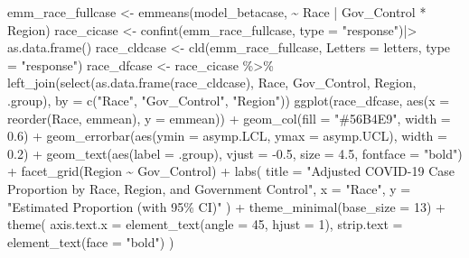\documentclass[
  letterpaper,
  DIV=11,
  numbers=noendperiod]{scrartcl}
\newenvironment{Shaded}{\begin{snugshade}}{\end{snugshade}}
\newcommand{\AttributeTok}[1]{\textcolor[rgb]{0.40,0.45,0.13}{#1}}
\newcommand{\DecValTok}[1]{\textcolor[rgb]{0.68,0.00,0.00}{#1}}
\newcommand{\FloatTok}[1]{\textcolor[rgb]{0.68,0.00,0.00}{#1}}
\newcommand{\FunctionTok}[1]{\textcolor[rgb]{0.28,0.35,0.67}{#1}}
\newcommand{\NormalTok}[1]{\textcolor[rgb]{0.00,0.23,0.31}{#1}}
\newcommand{\OtherTok}[1]{\textcolor[rgb]{0.00,0.23,0.31}{#1}}
\newcommand{\SpecialCharTok}[1]{\textcolor[rgb]{0.37,0.37,0.37}{#1}}
\newcommand{\StringTok}[1]{\textcolor[rgb]{0.13,0.47,0.30}{#1}}
\begin{document}
\begin{Shaded}
\begin{Highlighting}[]
\NormalTok{emm\_race\_fullcase }\OtherTok{\textless{}{-}} \FunctionTok{emmeans}\NormalTok{(model\_betacase, }\SpecialCharTok{\textasciitilde{}}\NormalTok{ Race }\SpecialCharTok{|}\NormalTok{ Gov\_Control }\SpecialCharTok{*}\NormalTok{ Region)}
\NormalTok{race\_cicase }\OtherTok{\textless{}{-}} \FunctionTok{confint}\NormalTok{(emm\_race\_fullcase, }\AttributeTok{type =} \StringTok{"response"}\NormalTok{)}\SpecialCharTok{|\textgreater{}}
  \FunctionTok{as.data.frame}\NormalTok{()}
\NormalTok{race\_cldcase }\OtherTok{\textless{}{-}} \FunctionTok{cld}\NormalTok{(emm\_race\_fullcase, }\AttributeTok{Letters =}\NormalTok{ letters, }\AttributeTok{type =} \StringTok{"response"}\NormalTok{)}
\NormalTok{race\_dfcase }\OtherTok{\textless{}{-}}\NormalTok{ race\_cicase }\SpecialCharTok{\%\textgreater{}\%}
  \FunctionTok{left\_join}\NormalTok{(}\FunctionTok{select}\NormalTok{(}\FunctionTok{as.data.frame}\NormalTok{(race\_cldcase), Race, Gov\_Control, Region, .group),}
            \AttributeTok{by =} \FunctionTok{c}\NormalTok{(}\StringTok{"Race"}\NormalTok{, }\StringTok{"Gov\_Control"}\NormalTok{, }\StringTok{"Region"}\NormalTok{))}
\FunctionTok{ggplot}\NormalTok{(race\_dfcase, }\FunctionTok{aes}\NormalTok{(}\AttributeTok{x =} \FunctionTok{reorder}\NormalTok{(Race, emmean), }\AttributeTok{y =}\NormalTok{ emmean)) }\SpecialCharTok{+}
  \FunctionTok{geom\_col}\NormalTok{(}\AttributeTok{fill =} \StringTok{"\#56B4E9"}\NormalTok{, }\AttributeTok{width =} \FloatTok{0.6}\NormalTok{) }\SpecialCharTok{+}
  \FunctionTok{geom\_errorbar}\NormalTok{(}\FunctionTok{aes}\NormalTok{(}\AttributeTok{ymin =}\NormalTok{ asymp.LCL, }\AttributeTok{ymax =}\NormalTok{ asymp.UCL), }\AttributeTok{width =} \FloatTok{0.2}\NormalTok{) }\SpecialCharTok{+}
  \FunctionTok{geom\_text}\NormalTok{(}\FunctionTok{aes}\NormalTok{(}\AttributeTok{label =}\NormalTok{ .group), }\AttributeTok{vjust =} \SpecialCharTok{{-}}\FloatTok{0.5}\NormalTok{, }\AttributeTok{size =} \FloatTok{4.5}\NormalTok{, }\AttributeTok{fontface =} \StringTok{"bold"}\NormalTok{) }\SpecialCharTok{+}
  \FunctionTok{facet\_grid}\NormalTok{(Region }\SpecialCharTok{\textasciitilde{}}\NormalTok{ Gov\_Control) }\SpecialCharTok{+}  
  \FunctionTok{labs}\NormalTok{(}
    \AttributeTok{title =} \StringTok{"Adjusted COVID{-}19 Case Proportion by Race, Region, and Government Control"}\NormalTok{,}
    \AttributeTok{x =} \StringTok{"Race"}\NormalTok{,}
    \AttributeTok{y =} \StringTok{"Estimated Proportion (with 95\% CI)"}
\NormalTok{  ) }\SpecialCharTok{+}
  \FunctionTok{theme\_minimal}\NormalTok{(}\AttributeTok{base\_size =} \DecValTok{13}\NormalTok{) }\SpecialCharTok{+}
  \FunctionTok{theme}\NormalTok{(}
    \AttributeTok{axis.text.x =} \FunctionTok{element\_text}\NormalTok{(}\AttributeTok{angle =} \DecValTok{45}\NormalTok{, }\AttributeTok{hjust =} \DecValTok{1}\NormalTok{),}
    \AttributeTok{strip.text =} \FunctionTok{element\_text}\NormalTok{(}\AttributeTok{face =} \StringTok{"bold"}\NormalTok{)}
\NormalTok{  )}
\end{Highlighting}
\end{Shaded}
\end{document}
